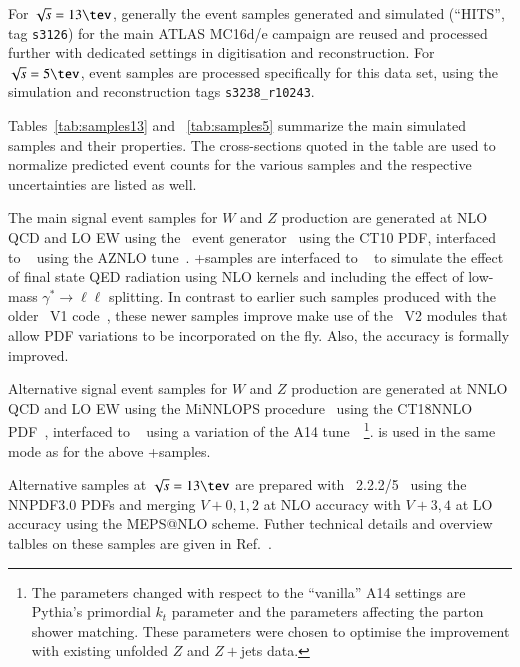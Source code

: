 For $\sqrt{s} = 13\tev$, generally the event samples generated and
simulated (``HITS'', tag \texttt{s3126}) for the main ATLAS MC16d/e campaign are reused and
processed further with dedicated settings in digitisation and
reconstruction. For $\sqrt{s} = 5\tev$, event samples are processed specifically for
this data set, using the simulation and reconstruction tags
\texttt{s3238\_r10243}.

Tables~\ref{tab:samples13} and ~\ref{tab:samples5} summarize the
main simulated samples and their properties. The cross-sections quoted in
the table are used to normalize predicted event counts for the various
samples and the respective uncertainties are listed as well.

The main signal event samples for $W$ and $Z$ production are generated
at NLO QCD and LO EW using the \Powheg\ event
generator~\cite{Nason:2004rx,Frixione:2007vw,Alioli:2010xd,Barze:2012tt,Barze:2013fru}
using the CT10 PDF, interfaced to \Pythia~\cite{pythia} using the
AZNLO tune~\cite{STDM-2012-23}. \Powheg+\Pythia samples are interfaced
to \Photos~\cite{Golonka:2005pn} to simulate the effect of final state
QED radiation using NLO kernels and including the effect of low-mass
$\gamma^* \to \ell\ell$ splitting. In contrast to earlier such samples
produced with the older \Powheg~V1 code~\cite{Alioli:2008gx}, these
newer samples improve make use of the \Powheg~V2 modules that allow
PDF variations to be incorporated on the fly. Also, the \Photos{}
accuracy is formally improved.

Alternative signal event samples for $W$ and $Z$ production are
generated at NNLO QCD and LO EW using the MiNNLOPS
procedure~\cite{Monni:2020nks,Monni:2019whf} using the CT18NNLO
PDF~\cite{Hou:2019efy}, interfaced to \Pythia~\cite{pythia} using a
variation of the A14 tune~\cite{ATL-PHYS-PUB-2014-021}~\footnote{The
  parameters changed with respect to the ``vanilla'' A14 settings are
  Pythia's primordial $k_t$ parameter and the parameters affecting the
  parton shower matching. These parameters were chosen to optimise the improvement
  with existing unfolded $Z$ \pt and $Z+$jets data.}.
\Photos{} is used in the same mode as for the above  \Powheg+\Pythia samples.

Alternative samples at $\sqrt{s} = 13\tev$ are prepared with \Sherpa\
2.2.2/5~\cite{Hoche:2010kg} using the NNPDF3.0 PDFs and merging
$V+0,1,2$ at NLO accuracy with $V+3,4$ at LO accuracy using the
MEPS@NLO scheme. Futher technical details and overview talbles on
these samples are given in Ref.~\cite{Kretzschmar:2657141}.


